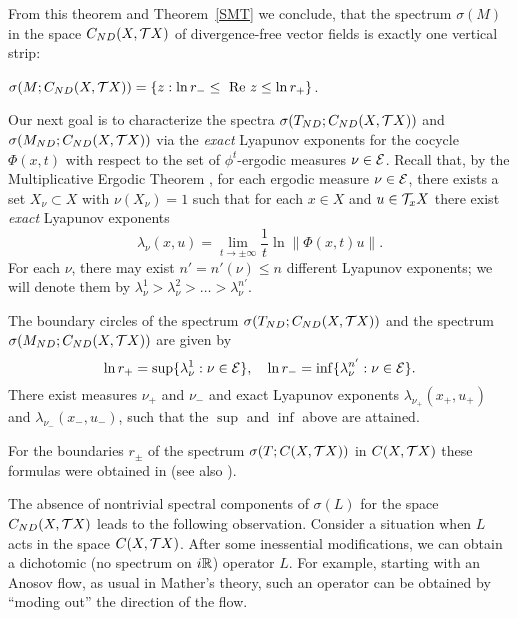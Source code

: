 {}From this theorem and Theorem~\ref{SMT} we conclude, that the spectrum
$\sigma(M)$ in the space ${C_{ND}(X,{{\cal{T}}X})}$ of divergence-free vector fields
 is exactly one vertical strip:
\begin{cor}
$\sigma(M;\CND)=\{z: \ln r_{-}
\le \text{ Re }z\leq \ln r_{+} \}$.
\end{cor}

Our next goal is to characterize the spectra $\sigma (T_{ND}; {C_{ND}(X,{{\cal{T}}X})})$ and
$\sigma(M_{ND};{C_{ND}(X,{{\cal{T}}X})})$ via the {\em exact} Lyapunov exponents for the
cocycle $\Phi(x,t)$ with respect to the set of  $\phi^t$-ergodic
measures $\nu\in{\cal{E}}$. Recall that, by the Multiplicative Ergodic
Theorem \cite{OselMET}, for each ergodic measure
$\nu\in{\cal{E}}$, there exists a set $X_\nu\subset X$ with $\nu(X_\nu)=1$
such that for each $x\in X$ and $u\in {\cal T}_xX$ there exist {\em
exact} Lyapunov exponents
\begin{equation}\label{eLE}
\lambda_\nu(x,u)=
\lim_{t\to\pm\infty}\dfrac{1}{t}\ln\|\Phi(x,t)u\|.
\end{equation}
For each $\nu$, there may exist  $n'=n'(\nu)\le n$
different Lyapunov exponents; we will denote them by
$\lambda_\nu^1> \lambda_\nu^2 > \dots > \lambda_\nu^{n'}$.
\begin{cor} \label{calcul} The boundary circles of the
spectrum $\sigma (T_{ND};{C_{ND}(X,{{\cal{T}}X})})$ and the spectrum
$\sigma(M_{ND};{C_{ND}(X,{{\cal{T}}X})})$ are given by
\begin{equation*}
 \ln r_{+} = \sup \{\lambda^1_\nu : \nu\in{\cal{E}}\},\quad
 \ln r_{-} = \inf \{\lambda^{n'}_\nu :
\nu\in{\cal{E}}\}.
\end{equation*}
There exist measures $\nu_+$ and $\nu_-$ and exact Lyapunov
exponents $\lambda_{\nu_+}(x_+,u_+)$ and
$\lambda_{\nu_-}(x_-,u_-)$, such that the
$\sup$ and $\inf$ above are attained.
 \end{cor}
\begin{pf} For the
boundaries $r_{\pm}$ of the spectrum
$\sigma(T;{C(X,{{\cal{T}}X})})$ in ${C(X,{{\cal{T}}X})}$
these formulas were obtained in \cite{LS} (see
also \cite{OselDYN}). \end{pf}



The absence of nontrivial
spectral components of $\sigma (L)$ for the space
${C_{ND}(X,{{\cal{T}}X})}$ leads to the following  observation.
 Consider a
 situation when  $L$ acts
in the space ${C(X,{{\cal{T}}X})}$.
After some inessential modifications, we can obtain
a dichotomic (no spectrum on $i{\Bbb{R}}$) operator $L$.
For example, starting with an Anosov flow, as usual in Mather's
theory, such an operator can be obtained by
``moding out'' the direction of the flow.

